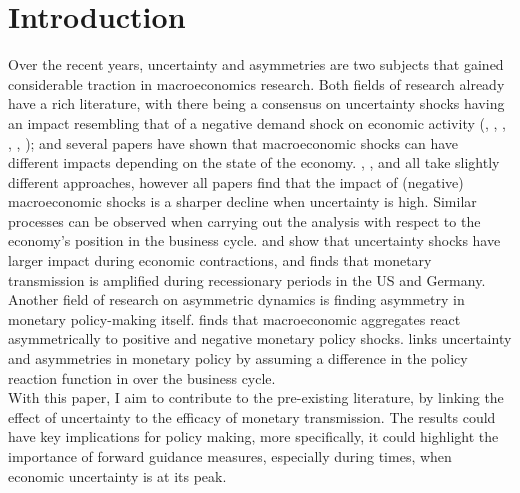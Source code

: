 \documentclass[12pt,a4paper]{article}
\begin{document}
\pagebreak

\section{Introduction}
Over the recent years, uncertainty and asymmetries are two subjects that gained considerable traction in macroeconomics research. Both fields of research already have a rich literature, with there being a consensus on uncertainty shocks having an impact resembling that of a negative demand shock on economic activity (\textcolor{blue}{\cite{CARRIERESWALLOW2013316}}, \textcolor{blue}{\cite{COLOMBO201339}}, \textcolor{blue}{\cite{CALDARA2016185}}, \textcolor{blue}{\cite{CHENG2018305}}, \textcolor{blue}{\cite{BONCIANI2020102236}}, \textcolor{blue}{\cite{NILAVONGSE2020108765}}); and several papers have shown that macroeconomic shocks can have different impacts depending on the state of the economy.
\textcolor{blue}{\cite{RePEc:eee:jmacro:v:69:y:2021:i:c:s0164070421000379}}, \textcolor{blue}{\cite{RePEc:fip:fedker:00016}}, \textcolor{blue}{\cite{RePEc:cup:macdyn:v:20:y:2016:i:05:p:1219-124600}} and \textcolor{blue}{\cite{RePEc:jae:japmet:v:19:y:2004:i:5:p:551-565}} all take slightly different approaches, however all papers find that the impact of (negative) macroeconomic shocks is a sharper decline when uncertainty is high. Similar processes can be observed when carrying out the analysis with respect to the economy's position in the business cycle. \textcolor{blue}{\cite{RePEc:knz:dpteco:1402}} and \textcolor{blue}{\cite{RePEc:een:camaaa:2020-72}} show that uncertainty shocks have larger impact during economic contractions, and \textcolor{blue}{\cite{RePEc:gro:rugsom:98c36}} finds that monetary transmission is amplified during recessionary periods in the US and Germany. Another field of research on asymmetric dynamics is finding asymmetry in monetary policy-making itself. \textcolor{blue}{\cite{Lin+2021+425+447}} finds that macroeconomic aggregates react asymmetrically to positive and negative monetary policy shocks. \textcolor{blue}{\cite{doi:10.1080/1331677X.2018.1481445}} links uncertainty and asymmetries in monetary policy by assuming a difference in the policy reaction function in over the business cycle. \\

With this paper, I aim to contribute to the pre-existing literature, by linking the effect of uncertainty to the efficacy of monetary transmission. The results could have key implications for policy making, more specifically, it could highlight the importance of forward guidance measures, especially during times, when economic uncertainty is at its peak. \\
\end{document}
